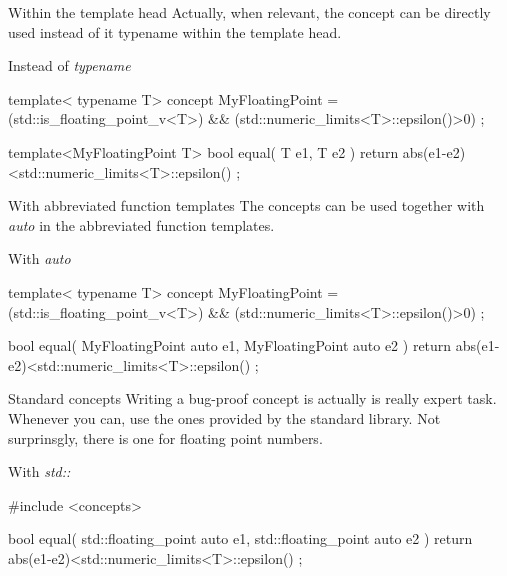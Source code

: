   \begin{frame}[fragile]
    \begin{block}{Within the template head}
        Actually, when relevant, the concept can be directly used instead of {it typename} within the template head.
    \end{block}
    \begin{exampleblock}{Instead of {\it typename}}
      \begin{cppcode*}{}
      template< typename T>
      concept MyFloatingPoint =
        (std::is_floating_point_v<T>) &&
        (std::numeric_limits<T>::epsilon()>0) ;

      template<MyFloatingPoint T>
      bool equal( T e1, T e2 )
      { return abs(e1-e2)<std::numeric_limits<T>::epsilon() ; }
      \end{cppcode*}
    \end{exampleblock}
  \end{frame}

  \begin{frame}[fragile]
    \begin{block}{With abbreviated function templates}
        The concepts can be used together with {\it auto} in the abbreviated function templates.
    \end{block}
    \begin{exampleblock}{With {\it auto}}
      \begin{cppcode*}{}
      template< typename T>
      concept MyFloatingPoint =
        (std::is_floating_point_v<T>) &&
        (std::numeric_limits<T>::epsilon()>0) ;

      bool equal( MyFloatingPoint auto e1, MyFloatingPoint auto e2 )
      { return abs(e1-e2)<std::numeric_limits<T>::epsilon() ; }
      \end{cppcode*}
    \end{exampleblock}
  \end{frame}

  \begin{frame}[fragile]
    \begin{block}{Standard concepts}
        Writing a bug-proof concept is actually is really expert task.
        Whenever you can, use the ones provided by the standard library.
        Not surprinsgly, there is one for floating point numbers.
    \end{block}
    \begin{exampleblock}{With {\it std::}}
      \begin{cppcode*}{}
      #include <concepts>

      bool equal( std::floating_point auto e1, std::floating_point auto e2 )
      { return abs(e1-e2)<std::numeric_limits<T>::epsilon() ; }
      \end{cppcode*}
    \end{exampleblock}
  \end{frame}

